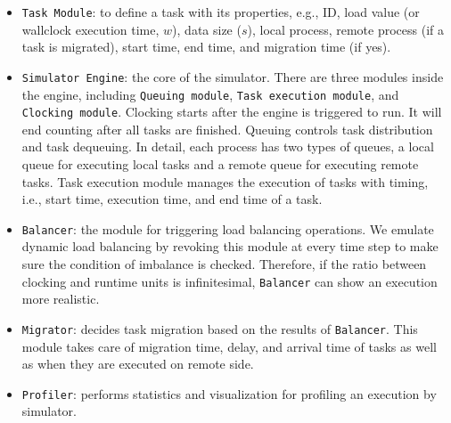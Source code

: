 \begin{itemize}
	\item \texttt{Task Module}: to define a task with its properties, e.g., ID, load value (or wallclock execution time, $w$), data size ($s$), local process, remote process (if a task is migrated), start time, end time, and migration time (if yes).
	
	\item \texttt{Simulator Engine}: the core of the simulator. There are three modules inside the engine, including \texttt{Queuing module}, \texttt{Task execution module}, and \texttt{Clocking module}. Clocking starts after the engine is triggered to run. It will end counting after all tasks are finished. Queuing controls task distribution and task dequeuing. In detail, each process has two types of queues, a local queue for executing local tasks and a remote queue for executing remote tasks. Task execution module manages the execution of tasks with timing, i.e., start time, execution time, and end time of a task.
	
	\item \texttt{Balancer}: the module for triggering load balancing operations. We emulate dynamic load balancing by revoking this module at every time step to make sure the condition of imbalance is checked. Therefore, if the ratio between clocking and runtime units is infinitesimal, \texttt{Balancer} can show an execution more realistic.
	
	\item \texttt{Migrator}: decides task migration based on the results of \texttt{Balancer}. This module takes care of migration time, delay, and arrival time of tasks as well as when they are executed on remote side.
	
	\item \texttt{Profiler}: performs statistics and visualization for profiling an execution by simulator.
\end{itemize}

